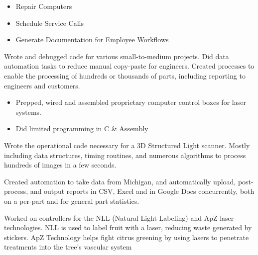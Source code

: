 \documentclass[10pt,letterpaper,ragged2e,withhyper]{altacv}
\begin{document}
\begin{paracol}{2}

\begin{itemize}
\item Repair Computers
\item Schedule Service Calls
\item Generate Documentation for Employee Workflows
\end{itemize}

Wrote and debugged code for various small-to-medium projects.
Did data automation tasks to reduce manual copy-paste for engineers.
Created processes to enable the processing of hundreds or thousands of parts,
including reporting to engineers and customers.

\begin{itemize}
\item Prepped, wired and assembled proprietary computer control boxes for laser systems.
\item Did limited programming in C \& Assembly
\end{itemize}


Wrote the operational code necessary for a 3D Structured Light scanner.
Mostly including data structures, timing routines, and numerous algorithms
to process hundreds of images in a few seconds.

Created automation to take data from Michigan,
and automatically upload, post-process, and output reports in CSV,
Excel and in Google Docs concurrently, both on a per-part and for
general part statistics.

Worked on controllers for the NLL (Natural Light Labeling) and ApZ laser technologies.
NLL is used to label fruit with a laser, reducing waste generated by stickers.
ApZ Technology helps fight citrus greening by using lasers to penetrate treatments into the tree’s vascular system


\end{paracol}
\end{document}
